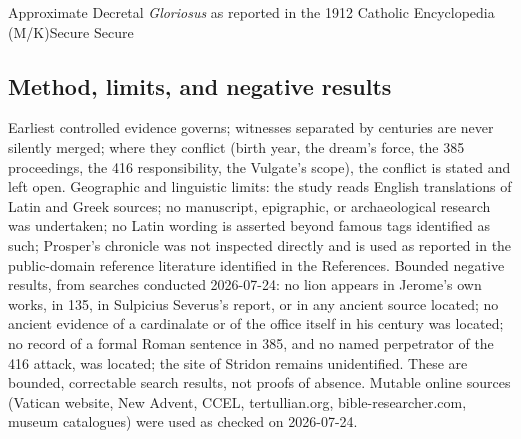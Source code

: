 \begin{lifetimeline}
{Approximate}
{Decretal \textit{Gloriosus} as reported in the 1912 Catholic Encyclopedia
(M/K)}{Secure}
{Secure}
\end{lifetimeline}

\subsection{Method, limits, and negative results}

Earliest controlled evidence governs; witnesses separated by centuries are
never silently merged; where they conflict (birth year, the dream's force,
the 385 proceedings, the 416 responsibility, the Vulgate's scope), the
conflict is stated and left open. Geographic and linguistic limits: the study
reads English translations of Latin and Greek sources; no manuscript,
epigraphic, or archaeological research was undertaken; no Latin wording is
asserted beyond famous tags identified as such; Prosper's chronicle was not
inspected directly and is used as reported in the public-domain reference
literature identified in the References. Bounded negative results, from
searches conducted 2026-07-24: no lion appears in Jerome's own works, in
 135, in Sulpicius Severus's report, or in any
ancient source located; no ancient evidence of a cardinalate or of the office
itself in his century was located; no record of a formal Roman sentence in
385, and no named perpetrator of the 416 attack, was located; the site of
Stridon remains unidentified. These are bounded, correctable search results,
not proofs of absence. Mutable online sources (Vatican website, New Advent,
CCEL, tertullian.org, bible-researcher.com, museum catalogues) were used as
checked on 2026-07-24.

